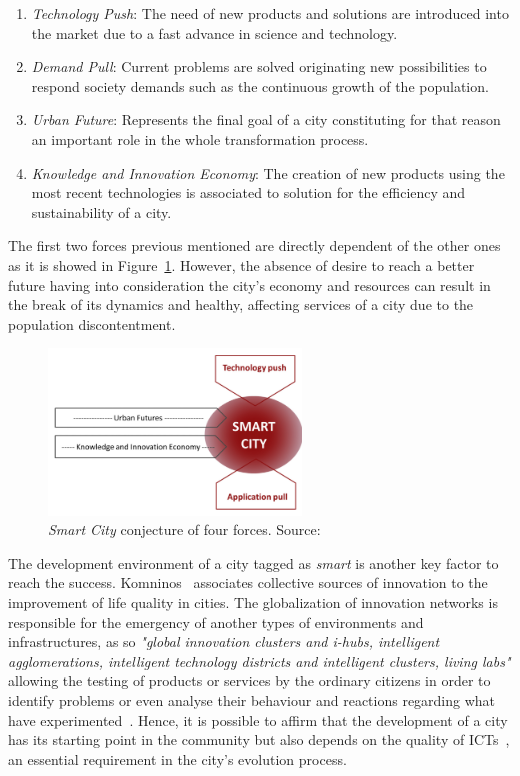 \begin{enumerate}
	\item \textit{Technology Push}: The need of new products and solutions are introduced into the market due to a fast advance in science and technology.
	\item \textit{Demand Pull}: Current problems are solved originating new possibilities to respond society demands such as the continuous growth of the population.
	\item \textit{Urban Future}: Represents the final goal of a city constituting for that reason an important role in the whole transformation process.
	\item \textit{Knowledge and Innovation Economy}: The creation of new products using the most recent technologies is associated to solution for the efficiency and sustainability of a city.
\end{enumerate}

The first two forces previous mentioned are directly dependent of the other ones as it is showed in Figure~\ref{fig:four_forces}. However, the absence of desire to reach a better future having into consideration the city's economy and resources can result in the break of its dynamics and healthy, affecting services of a city due to the population discontentment.

\begin{figure}
	\centering
	\includegraphics[width=0.6\textwidth]{figures/four_forces.png}
	\caption{\textit{Smart City} conjecture of four forces. Source:~\cite{angelidou2015smart}}
	\label{fig:four_forces}
\end{figure}

The development environment of a city tagged as \textit{smart} is another key factor to reach the success. Komninos~\cite{komninos2009intelligent} associates collective sources of innovation to the improvement of life quality in cities. The globalization of innovation networks is responsible for the emergency of another types of environments and infrastructures, as so \emph{"global innovation clusters and i-hubs, intelligent agglomerations, intelligent technology districts and intelligent clusters, living labs"} allowing the testing of products or services by the ordinary citizens in order to identify problems or even analyse their behaviour  and reactions regarding what have experimented~\cite{komninos2009intelligent}. Hence, it is possible to affirm that the development of a city has its starting point in the community but also depends on the quality of \glspl{ICT}~\cite{hollands2008will}, an essential requirement in the city's evolution process.

